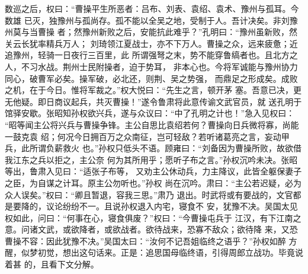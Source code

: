 数巡之后，权曰：“曹操平生所恶者：吕布、刘表、袁绍、袁术、豫州与孤耳。今数雄
已灭，独豫州与孤尚存。孤不能以全吴之地，受制于人。吾计决矣。非刘豫州莫与当曹操
者；然豫州新败之后，安能抗此难乎？”孔明曰：“豫州虽新败，然关云长犹率精兵万人；
刘琦领江夏战士，亦不下万人。曹操之众，远来疲惫；近追豫州，轻骑一日夜行三百里，此
所谓强弩之末，势不能穿鲁缟者也。且北方之人，不习水战。荆州士民附操者，迫于势耳，
非本心也。今将军诚能与豫州协力同心，破曹军必矣。操军破，必北还，则荆、吴之势强，
而鼎足之形成矣。成败之机，在于今日。惟将军裁之。”权大悦曰：“先生之言，顿开茅
塞。吾意已决，更无他疑。即日商议起兵，共灭曹操！”遂令鲁肃将此意传谕文武官员，就
送孔明于馆驿安歇。张昭知孙权欲兴兵，遂与众议曰：“中了孔明之计也！”急入见权曰：
“昭等闻主公将兴兵与曹操争锋。主公自思比袁绍若何？曹操向日兵微将寡，尚能一鼓克袁
绍；何况今日拥百万之众南征，岂可轻敌？若听诸葛亮之言，妄动甲兵，此所谓负薪救火
也。”孙权只低头不语。顾雍曰：“刘备因为曹操所败，故欲借我江东之兵以拒之，主公奈
何为其所用乎；愿听子布之言。”孙权沉吟未决。张昭等出，鲁肃入见曰：“适张子布等，
又劝主公休动兵，力主降议，此皆全躯保妻子之臣，为自谋之计耳。原主公勿听也。”孙权
尚在沉吟。肃曰：“主公若迟疑，必为众人误矣。”权曰：“卿且暂退，容我三思。”肃乃
退出。时武将或有要战的，文官都是要降的，议论纷纷不一。且说孙权退入内宅，寝食不
安，犹豫不决。吴国太见权如此，问曰：“何事在心，寝食俱废？”权曰：“今曹操屯兵于
江汉，有下江南之意。问诸文武，或欲降者，或欲战者。欲待战来，恐寡不敌众；欲待降
来，又恐曹操不容：因此犹豫不决。”吴国太曰：“汝何不记吾姐临终之语乎？”孙权如醉
方醒，似梦初觉，想出这句话来。正是：追思国母临终语，引得周郎立战功。毕竟说着甚
的，且看下文分解。